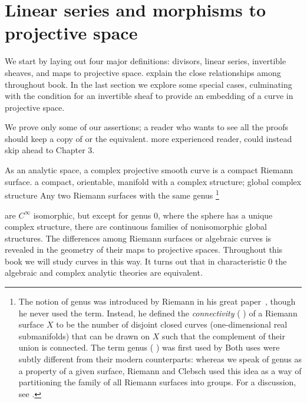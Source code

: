 

\chapter{Linear series and morphisms to projective space}\label{linear series}

We start by laying
out four major definitions:
divisors, linear series, invertible sheaves, and maps to projective space. 
explain the close relationships among 
throughout
book. In the last section 
we explore some special cases, culminating with
the condition for an invertible sheaf to provide an embedding of a curve in projective space.

We prove only some of our assertions; a reader who wants to see
all the proofs should keep
a copy of \cite{Hartshorne1977} or the equivalent. 
more experienced reader,
could instead skip ahead to Chapter 3.

As an analytic space, a complex projective smooth curve is a compact
Riemann surface. 
%
a compact, orientable,
manifold with a complex structure; 
global complex structure
%
%
Any two Riemann surfaces with the same genus%
\footnote{The notion of genus was introduced by Riemann in his great paper~\citeyear{Riemann}, though he never used the term. Instead,
he defined the \emph{connectivity} 
(%
) 
of a Riemann surface $X$
to be the number 
of disjoint 
closed curves 
(one-dimensional real submanifolds) that can be drawn on $X$ such that 
the complement of their union
is connected. The term genus 
(%
)
was first used by
\def\marginpar#1{}%
Both uses 
were 
subtly different
from their modern counterparts: whereas 
we speak of genus as a property of a given surface, Riemann and Clebsch 
used this idea as a way of partitioning the family of all Riemann
surfaces into groups.
For a discussion, see
\cite{MR4175877}.
\par
}

are $C^\infty$ isomorphic,
but except for genus 0, where the sphere has a unique complex structure,
there are continuous families of 
nonisomorphic 
global structures.  The differences among Riemann surfaces or
algebraic curves is revealed in 
the
geometry of their maps to projective spaces. Throughout this book we
will study curves in this way. 
It turns out that in characteristic 0 the algebraic and complex analytic theories are equivalent. 

